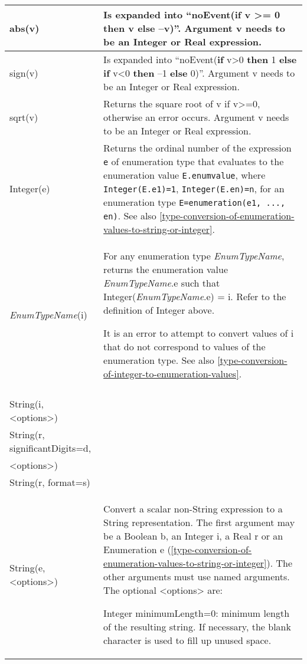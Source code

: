 \begin{longtable}{|p{4.5cm}|p{10.5cm}|} \hline
\endhead
abs(v) & Is expanded into ``noEvent(\textbf{if} v \textgreater{}= 0
\textbf{then} v \textbf{else} --v)''. Argument v needs to be an Integer
or Real expression.\\ \hline
sign(v) & Is expanded into ``noEvent(\textbf{if} v\textgreater{}0
\textbf{then} 1 \textbf{else if} v\textless{}0 \textbf{then} --1
\textbf{else} 0)''. Argument v needs to be an Integer or Real
expression.\\ \hline
sqrt(v) & Returns the square root of v if v\textgreater{}=0, otherwise
an error occurs. Argument v needs to be an Integer or Real
expression.\\ \hline
Integer(e) & Returns the ordinal number of the expression \lstinline!e! of
enumeration type that evaluates to the enumeration value \lstinline!E.enumvalue!,
where \lstinline!Integer(E.e1)=1!, \lstinline!Integer(E.en)=n!, for an enumeration type
\lstinline!E=enumeration(e1, ..., en)!. See also \autoref{type-conversion-of-enumeration-values-to-string-or-integer}.\\ \hline
\emph{EnumTypeName}(i) & 
For any enumeration type \emph{EnumTypeName}, returns the enumeration
value \emph{EnumTypeName}.e such that Integer(\emph{EnumTypeName}.e) =
i. Refer to the definition of Integer above.

It is an error to attempt to convert values of i that do not correspond
to values of the enumeration type. See also \autoref{type-conversion-of-integer-to-enumeration-values}.
\\ \hline
\begin{tabular}{@{}p{4.5cm}@{}}
String(b, \textless{}options\textgreater{})\\
String(i, \textless{}options\textgreater{})\\
String(r,
significantDigits=d,\\
\textless{}options\textgreater{})\\
String(r, format=s)\\
String(e, \textless{}options\textgreater{})
\end{tabular} & Convert a scalar non-String expression to a String representation. The
first argument may be a Boolean b, an Integer i, a Real r or an
Enumeration e (\autoref{type-conversion-of-enumeration-values-to-string-or-integer}). The other arguments must use named
arguments. The optional \textless{}options\textgreater{} are:

Integer minimumLength=0: minimum length of the resulting string. If
necessary, the blank character is used to fill up unused space.


\end{longtable}

